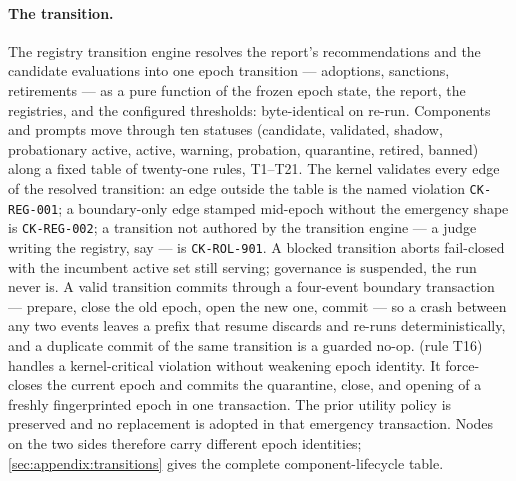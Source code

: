 \paragraph{The transition.}
The registry transition engine resolves the report's recommendations
and the candidate evaluations into one epoch transition --- adoptions,
sanctions, retirements --- as a pure function of the frozen epoch
state, the report, the registries, and the configured thresholds:
byte-identical on re-run. Components and prompts move through ten
statuses (candidate, validated, shadow, probationary active, active,
warning, probation, quarantine, retired, banned) along a fixed table
of twenty-one rules, T1--T21. The kernel validates every edge of the
resolved transition: an edge outside the table is the named violation
\texttt{CK-REG-001}; a boundary-only edge stamped mid-epoch without
the emergency shape is \texttt{CK-REG-002}; a transition not authored
by the transition engine --- a judge writing the registry, say --- is
\texttt{CK-ROL-901}. A blocked transition aborts fail-closed with the
incumbent active set still serving; governance is suspended, the run
never is. A valid transition commits through a four-event boundary
transaction --- prepare, close the old epoch, open the new one,
commit --- so a crash between any two events leaves a prefix that
resume discards and re-runs deterministically, and a duplicate commit
of the same transition is a guarded no-op. 
(rule T16) handles a kernel-critical violation without weakening epoch
identity. It force-closes the current epoch and commits the quarantine,
close, and opening of a freshly fingerprinted epoch in one transaction.
The prior utility policy is preserved and no replacement is adopted in
that emergency transaction. Nodes on the two sides therefore carry
different epoch identities; \cref{sec:appendix:transitions} gives the
complete component-lifecycle table.

